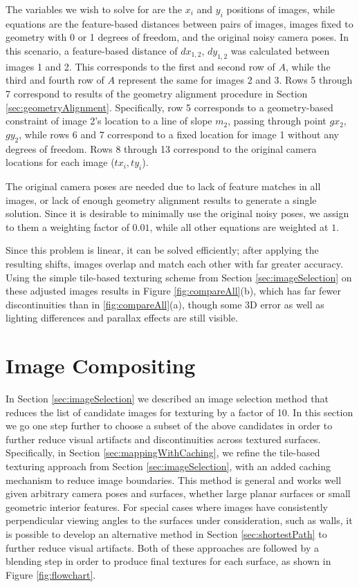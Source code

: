 \documentclass[]{spie}  %
\begin{document}
The variables we wish to solve for are the $x_i$ and $y_i$ positions
of images, while equations are the feature-based distances between
pairs of images, images fixed to geometry with 0 or 1 degrees of
freedom, and the original noisy camera poses. In this scenario, a
feature-based distance of $dx_{1,2}$, $dy_{1,2}$ was calculated
between images 1 and 2. This corresponds to the first and second row
of $A$, while the third and fourth row of $A$ represent the same for
images 2 and 3. Rows 5 through 7 correspond to results of the geometry
alignment procedure in Section
\ref{sec:geometryAlignment}. Specifically, row 5 corresponds to a
geometry-based constraint of image 2's location to a line of slope
$m_2$, passing through point $gx_2$, $gy_2$, while rows 6 and 7
correspond to a fixed location for image 1 without any degrees of
freedom. Rows 8 through 13 correspond to the original camera locations
for each image ($tx_i,ty_i$).

The original camera poses are needed due to lack of feature matches in
all images, or lack of enough geometry alignment results to generate a
single solution. Since it is desirable to minimally use the original
noisy poses, we assign to them a weighting factor of $0.01$, while all
other equations are weighted at $1$.

Since this problem is linear, it can be solved efficiently; after
applying the resulting shifts, images overlap and match each other
with far greater accuracy. Using the simple tile-based texturing
scheme from Section \ref{sec:imageSelection} on these adjusted images
results in Figure \ref{fig:compareAll}(b), which has far fewer
discontinuities than in \ref{fig:compareAll}(a), though some 3D error
as well as lighting differences and parallax effects are still
visible.

\section{Image Compositing}
\label{sec:imageCompositing}
In Section \ref{sec:imageSelection} we described an image selection
method that reduces the list of candidate images for texturing by a
factor of 10. In this section we go one step further to choose a
subset of the above candidates in order to further reduce visual
artifacts and discontinuities across textured surfaces. Specifically,
in Section \ref{sec:mappingWithCaching}, we refine the tile-based
texturing approach from Section \ref{sec:imageSelection}, with an
added caching mechanism to reduce image boundaries. This method is
general and works well given arbitrary camera poses and surfaces,
whether large planar surfaces or small geometric interior
features. For special cases where images have consistently
perpendicular viewing angles to the surfaces under consideration, such
as walls, it is possible to develop an alternative method in Section
\ref{sec:shortestPath} to further reduce visual artifacts. Both of
these approaches are followed by a blending step in order to produce
final textures for each surface, as shown in Figure
\ref{fig:flowchart}.
\end{document}
